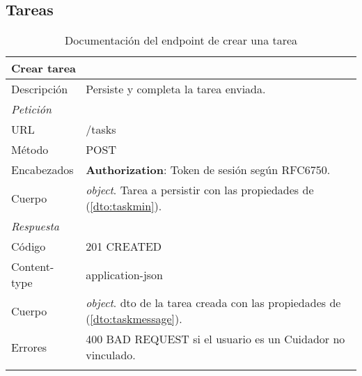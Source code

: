 \subsection{Tareas}

\vspace{-10pt}
\begin{longtable}{|p{} p{}|}
    \hline
    \multicolumn{2}{|l|}{\textbf{Crear tarea}} \\ \hline 
    Descripción         & Persiste y completa la tarea enviada. \\ \hline \hline
    \multicolumn{2}{|l|}{\emph{Petición}}  \\ \hline 
    URL      & /tasks \\ \hline
    Método   & POST                  \\ \hline
    Encabezados  & 
    \textbf{Authorization}: Token de sesión según RFC6750. \\ \hline
    Cuerpo  & \emph{object}. Tarea a persistir con las propiedades de \nameref{dto:taskmin} (\ref{dto:taskmin}). \\ \hline \hline
    \multicolumn{2}{|l|}{\emph{Respuesta}} \\ \hline 
    Código          & 201 CREATED          \\ \hline
    Content-type    & application-json  \\ \hline
    Cuerpo  & 
    \emph{object}. \acrshort{dto} de la tarea creada con las propiedades de \nameref{dto:taskmessage} (\ref{dto:taskmessage}). \\ \hline \hline
    Errores & 400 BAD REQUEST si el usuario es un Cuidador no vinculado.
    \\ \hline
    \caption{Documentación del endpoint de crear una tarea}
    \label{api:crear_tarea}
\end{longtable}

